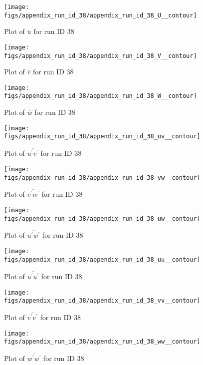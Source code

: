 \begin{figure}[H]
\centering
\texttt{[image: figs/appendix\_run\_id\_38/appendix\_run\_id\_38\_U\_\_contour]}
\caption{Plot of $\overline{u}$ for run ID 38}
\label{fig:appendix_run_id_38_U__contour}
\end{figure}


\begin{figure}[H]
\centering
\texttt{[image: figs/appendix\_run\_id\_38/appendix\_run\_id\_38\_V\_\_contour]}
\caption{Plot of $\overline{v}$ for run ID 38}
\label{fig:appendix_run_id_38_V__contour}
\end{figure}


\begin{figure}[H]
\centering
\texttt{[image: figs/appendix\_run\_id\_38/appendix\_run\_id\_38\_W\_\_contour]}
\caption{Plot of $\overline{w}$ for run ID 38}
\label{fig:appendix_run_id_38_W__contour}
\end{figure}


\begin{figure}[H]
\centering
\texttt{[image: figs/appendix\_run\_id\_38/appendix\_run\_id\_38\_uv\_\_contour]}
\caption{Plot of $\overline{u^\prime v^\prime}$ for run ID 38}
\label{fig:appendix_run_id_38_uv__contour}
\end{figure}


\begin{figure}[H]
\centering
\texttt{[image: figs/appendix\_run\_id\_38/appendix\_run\_id\_38\_vw\_\_contour]}
\caption{Plot of $\overline{v^\prime w^\prime}$ for run ID 38}
\label{fig:appendix_run_id_38_vw__contour}
\end{figure}


\begin{figure}[H]
\centering
\texttt{[image: figs/appendix\_run\_id\_38/appendix\_run\_id\_38\_uw\_\_contour]}
\caption{Plot of $\overline{u^\prime w^\prime}$ for run ID 38}
\label{fig:appendix_run_id_38_uw__contour}
\end{figure}


\begin{figure}[H]
\centering
\texttt{[image: figs/appendix\_run\_id\_38/appendix\_run\_id\_38\_uu\_\_contour]}
\caption{Plot of $\overline{u^\prime u^\prime}$ for run ID 38}
\label{fig:appendix_run_id_38_uu__contour}
\end{figure}


\begin{figure}[H]
\centering
\texttt{[image: figs/appendix\_run\_id\_38/appendix\_run\_id\_38\_vv\_\_contour]}
\caption{Plot of $\overline{v^\prime v^\prime}$ for run ID 38}
\label{fig:appendix_run_id_38_vv__contour}
\end{figure}


\begin{figure}[H]
\centering
\texttt{[image: figs/appendix\_run\_id\_38/appendix\_run\_id\_38\_ww\_\_contour]}
\caption{Plot of $\overline{w^\prime w^\prime}$ for run ID 38}
\label{fig:appendix_run_id_38_ww__contour}
\end{figure}


